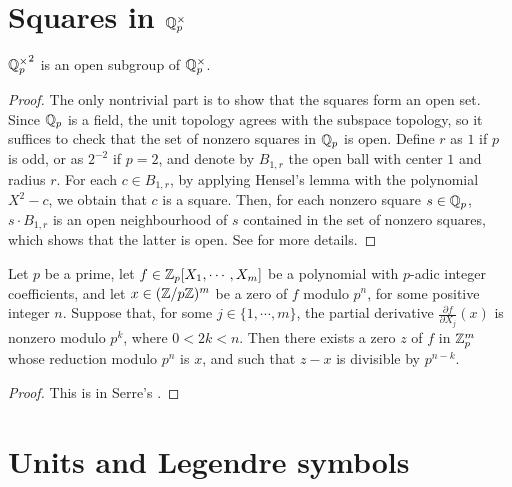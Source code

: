 \section[Squares in the p-adic units]{Squares in $\mathbb{Q}_p^{\times}$}\label{sec:padic_squares}

\begin{theorem}\label{thm:padic_squares_open}
\leanok
${\mathbb{Q}_p^\times}^2$ is an open subgroup of $\mathbb{Q}_p^\times$.
\end{theorem}

\begin{proof}
\leanok
The only nontrivial part is to show that the squares form an open set.  Since $\mathbb{Q}_p$ is a field, the unit topology agrees with the subspace topology, so it suffices to check that the set of nonzero squares in $\mathbb{Q}_p$ is open. Define $r$ as $1$ if $p$ is odd, or as $2^{-2}$ if $p = 2$, and denote by $B_{1, r}$ the open ball with center $1$ and radius $r$. For each $c \in B_{1, r}$, by applying Hensel's lemma with the polynomial $X^2 - c$, we obtain that $c$ is a square.
Then, for each nonzero square $s \in \mathbb{Q}_p$, $s \cdot B_{1, r}$ is an open neighbourhood of $s$ contained in the set of nonzero squares, which shows that the latter is open.
See \cite[\S II.3.3]{Ser73} for more details.
\end{proof}

\begin{lemma}
  \label{lem:multivariable_hensel}
  \leanok
Let $p$ be a prime, let $f \in \mathbb{Z}_p[X_1, \cdots, X_m]$ be a polynomial with $p$-adic integer
coefficients, and let $x \in (\mathbb{Z}/p\mathbb{Z})^m$ be a zero of $f$ modulo $p^n$, for some positive integer
$n$. Suppose that, for some $j \in \{1, \cdots, m\}$, the partial derivative
$\frac{\partial f}{\partial X_j}(x)$ is nonzero modulo $p^k$, where $0 < 2k < n$.
Then there exists a zero $z$ of $f$ in $\mathbb{Z}_p^m$ whose reduction modulo $p^n$ is $x$, and such that
$z-x$ is divisible by $p^{n-k}$.
\end{lemma}

\begin{proof}
This is in Serre's \cite[\S II.2 Theorem 1]{Ser73}.
\end{proof}

\section[Units and Legendre symbols]{Units and Legendre symbols}\label{sec:padic_legendre}

